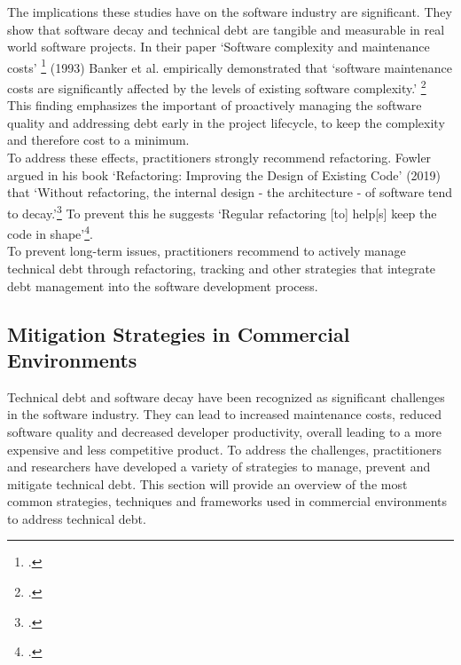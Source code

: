 The implications these studies have on the software industry are significant. They show that software decay and technical debt are tangible and measurable in real world software projects.
In their paper `Software complexity and maintenance costs' \footcite{dSoftwareComplexityMaintenance1993} (1993) Banker et al. empirically demonstrated that `software maintenance costs are significantly affected by the levels of existing software complexity.' \footcite[12]{dSoftwareComplexityMaintenance1993}
This finding emphasizes the important of proactively managing the software quality and addressing debt early in the project lifecycle, to keep the complexity and therefore cost to a minimum.\\
To address these effects, practitioners strongly recommend refactoring. Fowler argued in his book `Refactoring: Improving the Design of Existing Code' (2019)
that `Without refactoring, the internal design - the architecture - of software tend to decay.'\footcite[58]{fowlerRefactoringImprovingDesign2019}
To prevent this he suggests `Regular refactoring [to] help[s] keep the code in shape'\footcite[58]{fowlerRefactoringImprovingDesign2019}.\\
To prevent long-term issues, practitioners recommend to actively manage technical debt through refactoring, tracking and other strategies 
that integrate debt management into the software development process.\\

\subsection{Mitigation Strategies in Commercial Environments}
Technical debt and software decay have been recognized as significant challenges in the software industry. They can lead to 
increased maintenance costs, reduced software quality and decreased developer productivity, overall leading to a more expensive and less competitive product.
To address the challenges, practitioners and researchers have developed a variety of strategies to manage, prevent and mitigate technical debt.
This section will provide an overview of the most common strategies, techniques and frameworks used in commercial environments to address technical debt.\\

